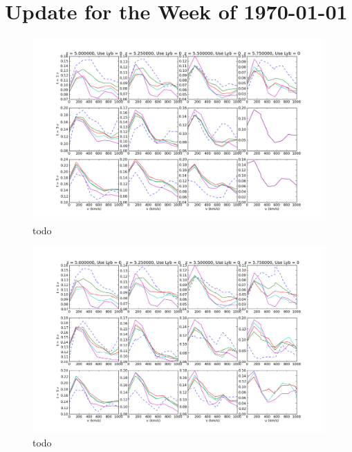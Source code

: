 \documentclass[11pt]{article}
\begin{document}
\section*{Update for the Week of \today}

\begin{figure}[h]
  \centering
  \includegraphics[width=18cm]{gridPlot_CommonRes.png}
  \caption{todo}
  \label{fig:todo}
\end{figure}

\begin{figure}[h]
  \centering
  \includegraphics[width=18cm]{gridPlot_CommonRes_AllSpectra.png}
  \caption{todo}
  \label{fig:todo}
\end{figure}
\end{document}
